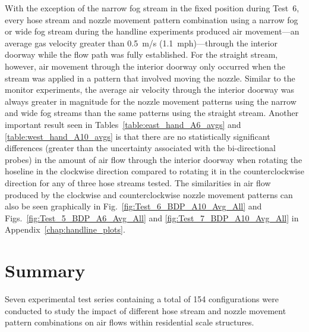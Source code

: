 \documentclass[12pt,oneside]{book}
\begin{document}
With the exception of the narrow fog stream in the fixed position during Test~6, every hose stream and nozzle movement pattern combination using a narrow fog or wide fog stream during the handline experiments produced air movement---an average gas velocity greater than 0.5~m/s (1.1~mph)---through the interior doorway while the flow path was fully established. For the straight stream, however, air movement through the interior doorway only occurred when the stream was applied in a pattern that involved moving the nozzle. Similar to the monitor experiments, the average air velocity through the interior doorway was always greater in magnitude for the nozzle movement patterns using the narrow and wide fog streams than the same patterns using the straight stream. Another important result seen in Tables~\ref{table:east_hand_A6_avgs} and \ref{table:west_hand_A10_avgs} is that there are no statistically significant differences (greater than the uncertainty associated with the bi-directional probes) in the amount of air flow through the interior doorway when rotating the hoseline in the clockwise direction compared to rotating it in the counterclockwise direction for any of three hose streams tested. The similarities in air flow produced by the clockwise and counterclockwise nozzle movement patterns can also be seen graphically in Fig.~\ref{fig:Test_6_BDP_A10_Avg_All} and Figs.~\ref{fig:Test_5_BDP_A6_Avg_All} and \ref{fig:Test_7_BDP_A10_Avg_All} in Appendix~\ref{chap:handline_plots}. 


\chapter{Summary}
\label{chap:summary}

Seven experimental test series containing a total of 154 configurations were conducted to study the impact of different hose stream and nozzle movement pattern combinations on air flows within residential scale structures. 
\end{document}
